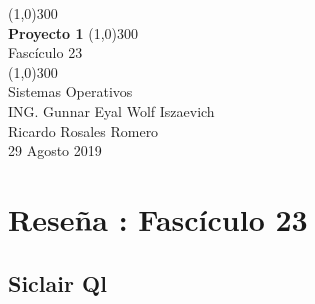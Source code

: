\documentclass[a4paper, 12pt]{article}
\begin{document}
\begin{titlepage}
	\begin{center}
		\line(1,0){300} \\
		\huge{\bfseries Proyecto 1 }
		\line(1,0){300} \\
		Fasc\'iculo 23\\
		\line(1,0){300} \\
		Sistemas Operativos \\
		{\normalsize ING. Gunnar Eyal Wolf Iszaevich }\\
		{\normalsize Ricardo Rosales Romero }\\
		{\small 29 Agosto 2019}
	\end{center}
\end{titlepage}

\setcounter{page}{2}
\fancyhf{}
\renewcommand{\headrulewidth}{2pt}
\renewcommand{\footrulewidth}{1pt}
\fancyhead[LE]{\leftmark}
\fancyhead[RO]{\nouppercase{\rightmark}}
\fancyfoot[LE, RO]{\thepage}


\section {Rese\~na : Fasc\'iculo 23}

\subsection*{Siclair Ql}
\end{document}

